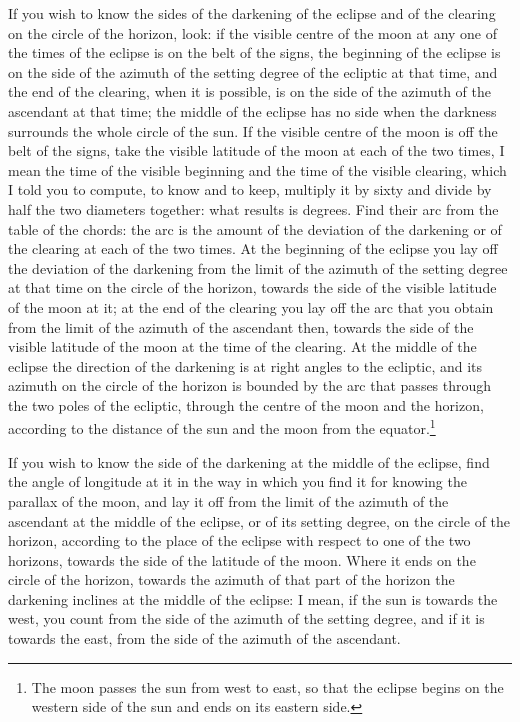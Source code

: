 \documentclass[11pt]{article}
\newcommand{\ArPage}[1]{\marginpar{\footnotesize\color{gray}Ar.\,p.\,#1}}
\begin{document}
\par \ArPage{166}If you wish to know the sides of the darkening of the eclipse and of the clearing on the circle of the horizon, look: if the visible centre of the moon at any one of the times of the eclipse is on the belt of the signs, the beginning of the eclipse is on the side of the azimuth of the setting degree of the ecliptic at that time, and the end of the clearing, when it is possible, is on the side of the azimuth of the ascendant at that time; the middle of the eclipse has no side when the darkness surrounds the whole circle of the sun. If the visible centre of the moon is off the belt of the signs, take the visible latitude of the moon at each of the two times, I mean the time of the visible beginning and the time of the visible clearing, which I told you to compute, to know and to keep, multiply it by sixty and divide by half the two diameters together: what results is degrees. Find their arc from the table of the chords: the arc is the amount of the deviation of the darkening or of the clearing at each of the two times. At the beginning of the eclipse you lay off the deviation of the darkening from the limit of the azimuth of the setting degree at that time on the circle of the horizon, towards the side of the visible latitude of the moon at it; at the end of the clearing you lay off the arc that you obtain from the limit of the azimuth of the ascendant then, towards the side of the visible latitude of the moon at the time of the clearing. At the middle of the eclipse the direction of the darkening is at right angles to the ecliptic, and its azimuth on the circle of the horizon is bounded by the arc that passes through the two poles of the ecliptic, through the centre of the moon and the horizon, according to the distance of the sun and the moon from the equator.\footnote{The moon passes the sun from west to east, so that the eclipse begins on the western side of the sun and ends on its eastern side.}\par
\par If you wish to know the side of the darkening at the middle of the eclipse, find the angle of longitude at it in the way in which you find it for knowing the parallax of the moon, and lay it off from the limit of the azimuth of the ascendant at the middle of the eclipse, or of its setting degree, on the circle of the horizon, according to the place of the eclipse with respect to one of the two horizons, towards the side of the latitude of the moon. Where it ends on the circle of the horizon, towards the azimuth of that part of the horizon the darkening inclines at the middle of the eclipse: I mean, if the sun is towards the west, you count from the side of the azimuth of the setting degree, and if it is towards the east, from the side of the azimuth of the ascendant.\par
\end{document}

